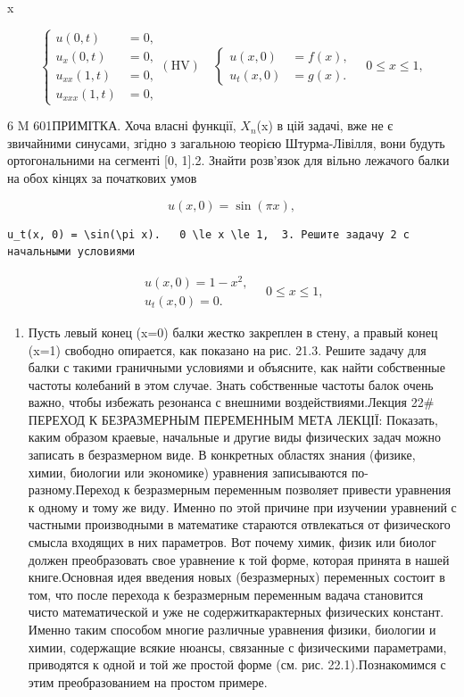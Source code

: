 \documentclass[
  ukrainian,
]{article}
\providecommand{\tightlist}{%
  \setlength{\itemsep}{0pt}\setlength{\parskip}{0pt}}
\begin{document}
x

\[
\begin{cases} u(0, t) &= 0, \\ u_x(0, t) &= 0, \\ u_{xx}(1, t) &= 0, \\ u_{xxx}(1, t) &= 0, \end{cases}
(\text{HV}) \quad
\begin{cases} u(x, 0) &= f(x), \\ u_t(x, 0) &= g(x). \end{cases}
\quad 0 \leqslant x \leqslant 1,
\]

6 M 601ПРИМІТКА. Хоча власні функції, \(X_n\)(x) в цій задачі, вже не є
звичайними синусами, згідно з загальною теорією Штурма-Лівілля, вони
будуть ортогональними на сегменті {[}0, 1{]}.2. Знайти розв'язок для
вільно лежачого балки на обох кінцях за початкових умов

\[
u(x, 0) = \sin(\pi x),
\]

\begin{verbatim}
u_t(x, 0) = \sin(\pi x).   0 \le x \le 1,  3. Решите задачу 2 с начальными условиями
\end{verbatim}

\[
\begin{array}{l} u(x, 0) = 1 - x^2, \\ u_t(x, 0) = 0. \end{array}
\quad 0 \le x \le 1,
\]

\begin{enumerate}
\def\labelenumi{\arabic{enumi}.}
\setcounter{enumi}{3}
\tightlist
\item
  Пусть левый конец (x=0) балки жестко закреплен в стену, а правый конец
  (x=1) свободно опирается, как показано на рис. 21.3. Решите задачу для
  балки с такими граничными условиями и объясните, как найти собственные
  частоты колебаний в этом случае. Знать собственные частоты балок очень
  важно, чтобы избежать резонанса с внешними воздействиями.Лекция 22\#
  ПЕРЕХОД К БЕЗРАЗМЕРНЫМ ПЕРЕМЕННЫМ МЕТА ЛЕКЦІЇ: Показать, каким образом
  краевые, начальные и другие виды физических задач можно записать в
  безразмерном виде. В конкретных областях знания (физике, химии,
  биологии или экономике) уравнения записываются по-разному.Переход к
  безразмерным переменным позволяет привести уравнения к одному и тому
  же виду. Именно по этой причине при изучении уравнений с частными
  производными в математике стараются отвлекаться от физического смысла
  входящих в них параметров. Вот почему химик, физик или биолог должен
  преобразовать свое уравнение к той форме, которая принята в нашей
  книге.Основная идея введения новых (безразмерных) переменных состоит в
  том, что после перехода к безразмерным переменным вадача становится
  чисто математической и уже не содержиткарактерных физических констант.
  Именно таким способом многие различные уравнения физики, биологии и
  химии, содержащие всякие нюансы, связанные с физическими параметрами,
  приводятся к одной и той же простой форме (см. рис. 22.1).Познакомимся
  с этим преобразованием на простом примере.
\end{enumerate}
\end{document}
